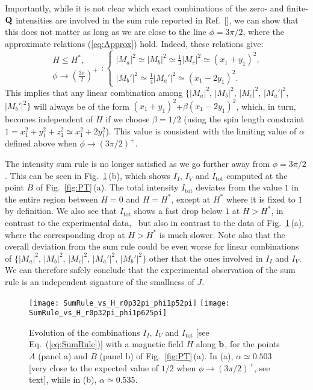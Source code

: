 \documentclass[prx,aps,groupedaddress,twocolumn]{revtex4-1}
\def\be{\begin{equation}}
\def\ee{\end{equation}}
\begin{document}
Importantly, while it is not clear which exact combinations of the zero- and finite-${\bf Q}$ intensities are involved in the sum rule reported in Ref.~[], we can show that this does not matter as long as we are close to the line $\phi\!=\!3\pi/2$, where the approximate relations (\ref{eq:Approx}) hold. Indeed, these relations give:
\be\label{eq:HleHc}
\begin{array}{l}
H\!\le\!H^\ast,\\
 \phi\to\left(\frac{3\pi}{2}\right)^+
 \end{array}\!\!:
\!\left\{\!\!
\begin{array}{l}
|M_a|^2 \!\simeq\! |M_b|^2 \!\simeq\! \frac{1}{3}|M_c|^2 \!\simeq\! (x_1\!+\!y_1)^2,\\
%
|M_b'|^2 \!\simeq\! \frac{1}{4}|M_a'|^2 \!\simeq\! (x_1\!-\!2y_1)^2.
\end{array}
\right.
\ee
This implies that any linear combination among $\{|M_a|^2$, $|M_b|^2$, $|M_c|^2$, $|M_a'|^2$, $|M_b'|^2\}$ will always be of the form $ (x_1\!+\!y_1)^2$+$\beta(x_1\!-\!2y_1)^2$, which, in turn, becomes independent of $H$ if we choose $\beta\!=\!1/2$ (using the spin length constraint $1\!=\!x_1^2\!+\!y_1^2\!+\!z_1^2\!\simeq \!x_1^2\!+\!2y_1^2$). This value is consistent with the limiting value of $\alpha$ defined above when $\phi\!\to\!(3\pi/2)^+$. 


The intensity sum rule is no longer satisfied as we go further away from $\phi\!=\!3\pi/2$. This can be seen in Fig.~\ref{fig:SumRule}\,(b), which shows $I_I$, $I_V$ and $I_{\text{tot}}$ computed at the point $B$ of Fig.~\ref{fig:PT}\,(a). The total intensity $I_{\text{tot}}$ deviates from the value $1$ in the entire region between $H\!=\!0$ and $H\!=\!H^\ast$, except at $H^\ast$ where it is fixed to $1$ by definition. 
%
We also see that $I_{\text{tot}}$ shows a fast drop below $1$ at $H\!>\!H^\ast$, in contrast to the experimental data,~\cite{Ruiz2017} but also in contrast to the data of Fig.~\ref{fig:SumRule}\,(a), where the corresponding drop at $H\!>\!H^\ast$ is much slower. 
%
Note also that the overall deviation from the sum rule could  be even worse for linear combinations of $\{|M_a|^2$, $|M_b|^2$, $|M_c|^2$, $|M_a'|^2$, $|M_b'|^2\}$ other that the ones involved in $I_I$ and $I_V$.  
%
We can therefore safely conclude that the experimental observation of the sum rule is an independent signature of the smallness of $J$.

\begin{figure}[!t]
\texttt{[image: SumRule\_vs\_H\_r0p32pi\_phi1p52pi]}
\texttt{[image: SumRule\_vs\_H\_r0p32pi\_phi1p625pi]}
\caption{Evolution of the combinations $I_I$, $I_V$ and $I_{\text{tot}}$ [see Eq.~(\ref{eq:SumRule})] with a magnetic field $H$ along ${\bf b}$, for the points $A$ (panel a) and $B$ (panel b) of Fig.~\ref{fig:PT}\,(a). 
%
In (a), $\alpha\!\simeq\!0.503$ [very close to the expected value of $1/2$ when $\phi\!\to\!(3\pi/2)^+$, see text], while in (b), $\alpha\!\simeq\!0.535$.}
\vspace*{-0.25cm}
\label{fig:SumRule}
\end{figure}  
\end{document}
